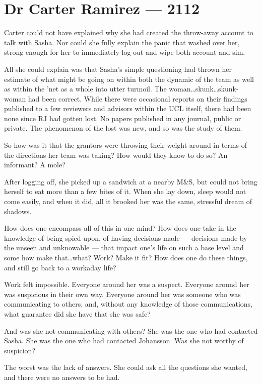 \hypertarget{dr-carter-ramirez-2112}{%
\chapter*{Dr Carter Ramirez — 2112}\label{dr-carter-ramirez-2112}}

Carter could not have explained why she had created the throw-away account to talk with Sasha. Nor could she fully explain the panic that washed over her, strong enough for her to immediately log out and wipe both account and sim.

All she could explain was that Sasha's simple questioning had thrown her estimate of what might be going on within both the dynamic of the team as well as within the 'net as a whole into utter turmoil. The woman\ldots{}skunk\ldots{}skunk-woman had been correct. While there were occasional reports on their findings published to a few reviewers and advisors within the UCL itself, there had been none since RJ had gotten lost. No papers published in any journal, public or private. The phenomenon of the lost was new, and so was the study of them.

So how was it that the grantors were throwing their weight around in terms of the directions her team was taking? How would they know to do so? An informant? A mole?

After logging off, she picked up a sandwich at a nearby M\&S, but could not bring herself to eat more than a few bites of it. When she lay down, sleep would not come easily, and when it did, all it brooked her was the same, stressful dream of shadows.

How does one encompass all of this in one mind? How does one take in the knowledge of being spied upon, of having decisions made — decisions made by the unseen and unknowable — that impact one's life on such a base level and some how make that\ldots{}what? Work? Make it fit? How does one do these things, and still go back to a workaday life?

Work felt impossible. Everyone around her was a suspect. Everyone around her was suspicious in their own way. Everyone around her was someone who was communicating to others, and, without any knowledge of those communications, what guarantee did she have that she was safe?

And was she not communicating with others? She was the one who had contacted Sasha. She was the one who had contacted Johansson. Was she not worthy of suspicion?

The worst was the lack of answers. She could ask all the questions she wanted, and there were no answers to be had.


